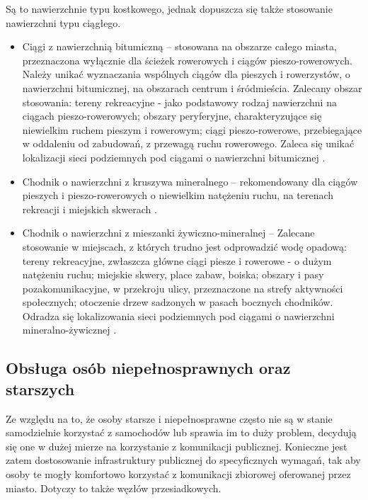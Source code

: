 \documentclass[twoside,12pt]{article}
\begin{document}
	 Są to nawierzchnie typu kostkowego, jednak dopuszcza się także stosowanie nawierzchni typu ciągłego.
	 
	 \begin{itemize}\setlength{\itemsep}{0em}
	 \item Ciągi z nawierzchnią bitumiczną --  stosowana na obszarze całego miasta, przeznaczona wyłącznie dla ścieżek rowerowych i ciągów pieszo-rowerowych. Należy unikać wyznaczania wspólnych ciągów dla pieszych i rowerzystów, o nawierzchni bitumicznej, na obszarach centrum i śródmieścia. Zalecany obszar stosowania: tereny rekreacyjne - jako podstawowy rodzaj nawierzchni na ciągach pieszo-rowerowych;  obszary peryferyjne, charakteryzujące się niewielkim ruchem pieszym i rowerowym; ciągi pieszo-rowerowe, przebiegające w oddaleniu od zabudowań, z przewagą ruchu rowerowego.  Zaleca się unikać lokalizacji sieci podziemnych pod ciągami o nawierzchni bitumicznej \cite{standardy_wroclaw}. 
	\item Chodnik o nawierzchni z kruszywa mineralnego -- rekomendowany dla ciągów pieszych i pieszo-rowerowych o niewielkim natężeniu ruchu, na terenach rekreacji i miejskich skwerach \cite{standardy_wroclaw}.
	\item Chodnik o nawierzchni z mieszanki żywiczno-mineralnej -- Zalecane stosowanie w miejscach, z których trudno jest odprowadzić wodę opadową: tereny rekreacyjne, zwłaszcza główne ciągi piesze i rowerowe - o dużym natężeniu ruchu;  miejskie skwery, place zabaw, boiska; obszary i pasy pozakomunikacyjne, w przekroju ulicy, przeznaczone na strefy aktywności społecznych; otoczenie drzew sadzonych w pasach bocznych chodników. Odradza się lokalizowania sieci podziemnych pod ciągami o nawierzchni mineralno-żywicznej \cite{standardy_wroclaw}. 
	 \end{itemize}
	 
	 \subsection{Obsługa osób niepełnosprawnych oraz starszych}
	 
	 Ze względu na to, że osoby starsze i niepełnosprawne często nie są w stanie samodzielnie korzystać z samochodów lub sprawia im to duży problem, decydują się one w dużej mierze na korzystanie z komunikacji publicznej. Konieczne jest zatem dostosowanie infrastruktury publicznej do specyficznych wymagań, tak aby osoby te mogły komfortowo korzystać z komunikacji zbiorowej oferowanej przez miasto. Dotyczy to także węzłów przesiadkowych.
	 
\end{document}
